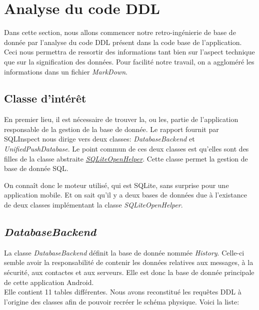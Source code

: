 \documentclass[a4paper,11pt]{article}
\begin{document}

\section{Analyse du code DDL}

Dans cette section, nous allons commencer notre retro-ingénierie de base de donnée par l'analyse du code DDL présent dans la code base de l'application. Ceci nous permettra de ressortir des informations tant bien sur l'aspect technique que sur la signification des données. Pour facilité notre travail, on a aggloméré les informations dans un fichier \textit{MarkDown}. 

\subsection{Classe d'intérêt}

En premier lieu, il est nécessaire de trouver la, ou les, partie de l'application responsable de la gestion de la base de donnée.
Le rapport fournit par SQLInspect nous dirige vers deux classes: \textit{DatabaseBackend} et \textit{UnifiedPushDatabase}.
Le point commun de ces deux classes est qu'elles sont des filles de la classe abstraite \href{https://developer.android.com/reference/android/database/sqlite/SQLiteOpenHelper}{\textit{SQLiteOpenHelper}}. Cette classe permet la gestion de base de donnée SQL.

On connaît donc le moteur utilisé, qui est SQLite, sans surprise pour une application mobile. Et on sait qu'il y a deux bases de données due à l'existance de deux classes implémentant la classe \textit{SQLiteOpenHelper}.

\subsection{\textit{DatabaseBackend}}

La classe \textit{DatabaseBackend} définit la base de donnée nommée \textit{History}. Celle-ci semble avoir la responsabilité de contenir les données relatives aux messages, à la sécurité, aux contactes et aux serveurs. Elle est donc la base de donnée principale de cette application Android.\\
Elle contient 11 tables différentes. Nous avons reconstitué les requêtes DDL à l'origine des classes afin de pouvoir recréer le schéma physique. Voici la liste:
\end{document}
